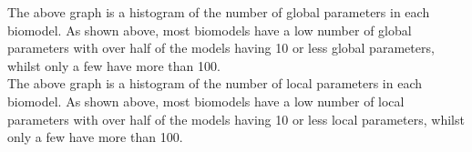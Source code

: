 \documentclass[portrait,a0paper,fontscale=0.35]{baposter}
\begin{document}
\begin{poster}
{ \begin{multicols}{2}
 The above graph is a histogram of the number of global parameters in each biomodel. As shown above, most biomodels have a low number of global parameters with over half of the models having 10 or less global parameters, whilst only a few have more than 100.\\
      
  The above graph is a histogram of the number of local parameters in each biomodel. As shown above, most biomodels have a low number of local parameters with over half of the models having 10 or less local parameters, whilst only a few have more than 100.\\
 \end{multicols}
 }
 
 
 

\end{poster}
\end{document}

